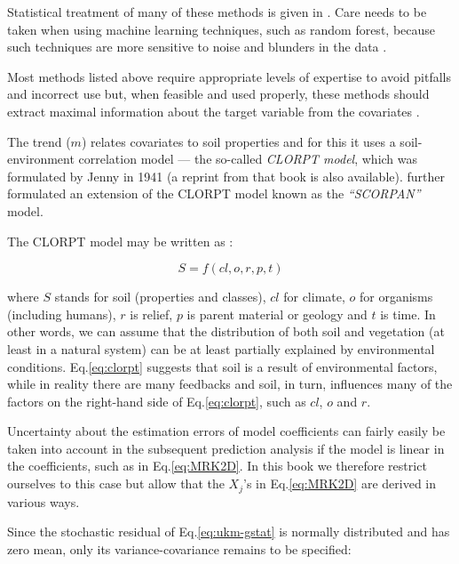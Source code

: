 \documentclass[11pt]{krantz}
\theoremstyle{definition}
\theoremstyle{definition}
\theoremstyle{definition}
\theoremstyle{remark}
\begin{document}
Statistical treatment of many of these methods is given in
\citet{hastie2009elements}. Care needs to be taken when using machine
learning techniques, such as random forest, because such techniques are
more sensitive to noise and blunders in the data .

Most methods listed above require appropriate levels of expertise to
avoid pitfalls and incorrect use but, when feasible and used properly,
these methods should extract maximal information about the target
variable from the covariates \citep{Statnikov2008, kanevski2009machine}.

The trend (\(m\)) relates covariates to soil properties and for this it
uses a soil-environment correlation model --- the so-called \emph{CLORPT
model}, which was formulated by Jenny in 1941 (a
\citeyearpar{jenny1994factors} reprint from that book is also
available). \citet{McBratney2003Geoderma} further formulated an
extension of the CLORPT model known as the \emph{``SCORPAN''} model.

The CLORPT model may be written as
\citep{jenny1994factors, Florinsky2012Dokuchaev}:

\begin{equation}
S = f (cl, o, r, p, t)
\label{eq:clorpt}
\end{equation}

where \(S\) stands for soil (properties and classes), \(cl\) for
climate, \(o\) for organisms (including humans), \(r\) is relief, \(p\)
is parent material or geology and \(t\) is time. In other words, we can
assume that the distribution of both soil and vegetation (at least in a
natural system) can be at least partially explained by environmental
conditions. Eq.\eqref{eq:clorpt} suggests that soil is a result of
environmental factors, while in reality there are many feedbacks and
soil, in turn, influences many of the factors on the right-hand side of
Eq.\eqref{eq:clorpt}, such as \(cl\), \(o\) and \(r\).

Uncertainty about the estimation errors of model coefficients can fairly
easily be taken into account in the subsequent prediction analysis if
the model is linear in the coefficients, such as in Eq.\eqref{eq:MRK2D}.
In this book we therefore restrict ourselves to this case but allow that
the \(X_j\)'s in Eq.\eqref{eq:MRK2D} are derived in various ways.

Since the stochastic residual of Eq.\eqref{eq:ukm-gstat} is normally
distributed and has zero mean, only its variance-covariance remains to
be specified:
\end{document}
